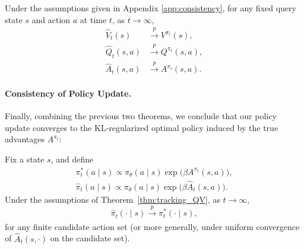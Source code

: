 \begin{theorem}\label{thm:tracking_QV}
Under the assumptions given in Appendix \ref{app:consistency}, for any fixed query state $s$ and action $a$ at time
$t$, as $t\to\infty$,
\begin{align*}
\widehat V_t(s) & \xrightarrow{p} V^{\pi_t}(s),\\
\widehat Q_t(s,a) & \xrightarrow{p} Q^{\pi_t}(s,a), \\
\widehat A_t(s,a) & \xrightarrow{p} A^{\pi_t}(s,a).
\end{align*}
\end{theorem}

\paragraph{Consistency of Policy Update.}
Finally, combining the previous two theorems, we conclude that our policy update converges to the KL-regularized optimal policy induced by the true advantages $A^{\pi_t}$:

\begin{theorem}
\label{cor:policy_consistency}
Fix a state $s$, and define
\begin{align*}
\pi_t^*(a\mid s)\propto \pi_\theta(a\mid s)\exp\!\big(\beta A^{\pi_t}(s,a)\big),\\
\widehat\pi_t(a\mid s)\propto \pi_\theta(a\mid s)\exp\!\big(\beta \widehat A_t(s,a)\big).
\end{align*}
Under the assumptions of Theorem~\ref{thm:tracking_QV},
as $t\to\infty$,
\[
\widehat\pi_t(\cdot\mid s) \xrightarrow[]{p} \pi_t^*(\cdot\mid s),
\]
for any finite candidate action set (or more generally, under uniform convergence of $\widehat A_t(s,\cdot)$ on the candidate set).
\end{theorem}









